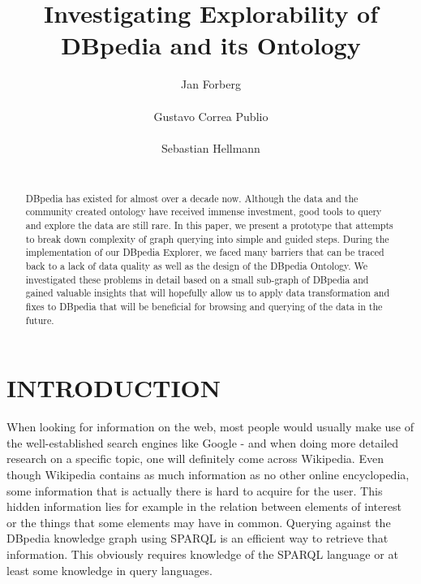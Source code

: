 \documentclass{sig-alternate}
\begin{document}
\title{Investigating Explorability of DBpedia and its Ontology}

\author{
\alignauthor
Jan Forberg\\
\\
\alignauthor
Gustavo Correa Publio\\
\\
\alignauthor
Sebastian Hellmann\\
\\
}
\maketitle

\begin{abstract}
DBpedia has existed for almost over a decade now. Although the data and the community created ontology have received immense investment, good tools to query and explore the data are still rare. In this paper, we present a prototype that attempts to break down complexity of graph querying into simple and guided steps. During the implementation of our DBpedia Explorer, we faced many barriers that can be traced back to a lack of data quality as well as the design of the DBpedia Ontology. We investigated these problems in detail based on a small sub-graph of DBpedia and gained valuable insights that will hopefully allow us to apply data transformation and ﬁxes to DBpedia that will be beneﬁcial for browsing and querying of the data in the future.
\end{abstract}




\section{INTRODUCTION}

When looking for information on the web, most people would usually make use of the well-established search engines like Google - and when doing more detailed research on a speciﬁc topic, one will deﬁnitely come across Wikipedia. Even though Wikipedia contains as much information as no other online encyclopedia, some information that is actually there is hard to acquire for the user. This hidden information lies for example in the relation between elements of interest or the things that some elements may have in common. Querying against the DBpedia knowledge graph using SPARQL is an eﬃcient way to retrieve that information. This obviously requires knowledge of the SPARQL language or at least some knowledge in query languages.
\end{document}
